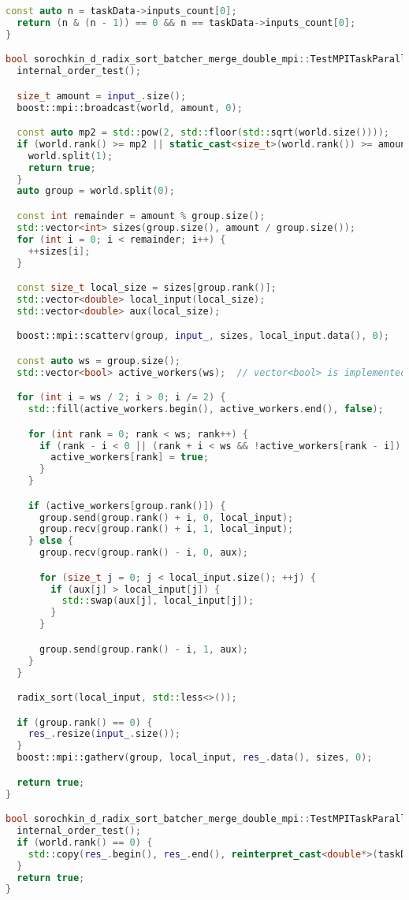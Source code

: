 \documentclass[12pt]{article}
\begin{document}
\begin{lstlisting}[language=C++, caption={Код алгоритма}]
  const auto n = taskData->inputs_count[0];
  return (n & (n - 1)) == 0 && n == taskData->inputs_count[0];
}

bool sorochkin_d_radix_sort_batcher_merge_double_mpi::TestMPITaskParallel::run() {
  internal_order_test();

  size_t amount = input_.size();
  boost::mpi::broadcast(world, amount, 0);

  const auto mp2 = std::pow(2, std::floor(std::sqrt(world.size())));
  if (world.rank() >= mp2 || static_cast<size_t>(world.rank()) >= amount) {
    world.split(1);
    return true;
  }
  auto group = world.split(0);

  const int remainder = amount % group.size();
  std::vector<int> sizes(group.size(), amount / group.size());
  for (int i = 0; i < remainder; i++) {
    ++sizes[i];
  }

  const size_t local_size = sizes[group.rank()];
  std::vector<double> local_input(local_size);
  std::vector<double> aux(local_size);

  boost::mpi::scatterv(group, input_, sizes, local_input.data(), 0);

  const auto ws = group.size();
  std::vector<bool> active_workers(ws);  // vector<bool> is implemented as a bitset actually

  for (int i = ws / 2; i > 0; i /= 2) {
    std::fill(active_workers.begin(), active_workers.end(), false);

    for (int rank = 0; rank < ws; rank++) {
      if (rank - i < 0 || (rank + i < ws && !active_workers[rank - i])) {
        active_workers[rank] = true;
      }
    }

    if (active_workers[group.rank()]) {
      group.send(group.rank() + i, 0, local_input);
      group.recv(group.rank() + i, 1, local_input);
    } else {
      group.recv(group.rank() - i, 0, aux);

      for (size_t j = 0; j < local_input.size(); ++j) {
        if (aux[j] > local_input[j]) {
          std::swap(aux[j], local_input[j]);
        }
      }

      group.send(group.rank() - i, 1, aux);
    }
  }

  radix_sort(local_input, std::less<>());

  if (group.rank() == 0) {
    res_.resize(input_.size());
  }
  boost::mpi::gatherv(group, local_input, res_.data(), sizes, 0);

  return true;
}

bool sorochkin_d_radix_sort_batcher_merge_double_mpi::TestMPITaskParallel::post_processing() {
  internal_order_test();
  if (world.rank() == 0) {
    std::copy(res_.begin(), res_.end(), reinterpret_cast<double*>(taskData->outputs[0]));
  }
  return true;
}


\end{lstlisting}
\end{document}
